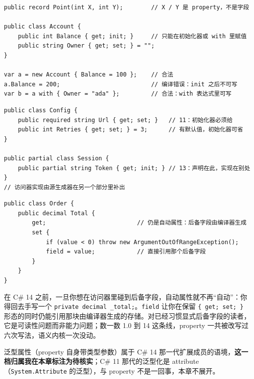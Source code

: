 \documentclass[12pt,a4paper,fontset=fandol]{ctexbook}
\newcommand{\csharplabel}{%
  \tcbox[on line,colback=csharpheadbg,colframe=csharpheadbg,
    boxrule=0pt,arc=1pt,left=2pt,right=2pt,top=1pt,bottom=1pt,
    colupper=white,fontupper=\scriptsize\bfseries]{C\#}}
\begin{document}
\csharplabel{}
\begin{lstlisting}[style=csharpstyle, caption={C\# 9.0：\texttt{init} 与 record 的位置式 property}, label={lst:ch2-cs-90}]
public record Point(int X, int Y);        // X / Y 是 property，不是字段

public class Account {
    public int Balance { get; init; }     // 只能在初始化器或 with 里赋值
    public string Owner { get; set; } = "";
}

var a = new Account { Balance = 100 };    // 合法
a.Balance = 200;                          // 编译错误：init 之后不可写
var b = a with { Owner = "ada" };         // 合法：with 表达式里可写
\end{lstlisting}

\csharplabel{}
\begin{lstlisting}[style=csharpstyle, caption={C\# 11 的 \texttt{required} 与 C\# 13 的 partial property}, label={lst:ch2-cs-11}]
public class Config {
    public required string Url { get; set; }   // 11：初始化器必须给
    public int Retries { get; set; } = 3;      // 有默认值，初始化器可省
}

public partial class Session {
    public partial string Token { get; init; } // 13：声明在此，实现在别处
}
// 访问器实现由源生成器在另一个部分里补出
\end{lstlisting}

\csharplabel{}
\begin{lstlisting}[style=csharpstyle, caption={C\# 14：\texttt{field} 上下文关键字}, label={lst:ch2-cs-14}]
public class Order {
    public decimal Total {
        get;                          // 仍是自动属性：后备字段由编译器生成
        set {
            if (value < 0) throw new ArgumentOutOfRangeException();
            field = value;            // 直接引用那个后备字段
        }
    }
}
\end{lstlisting}

\begin{note}[title={\texttt{field} 解决的是样板问题}]
在 C\# 14 之前，一旦你想在访问器里碰到后备字段，自动属性就不再“自动”：你得回去手写一个 \texttt{private decimal \_total;}。\texttt{field} 让你在保留 \texttt{\{ get; set; \}} 形态的同时仍能引用那块由编译器生成的存储。对已经习惯显式后备字段的读者，它是可读性问题而非能力问题；数一数 1.0 到 14 这条线，property 一共被改写过六次写法，语义内核一次没动。
\end{note}

泛型属性（property 自身带类型参数）属于 C\# 14 那一代扩展成员的语境，\textbf{这一档归属我在本章标注为待核实}；C\# 11 那代的泛型化是 attribute（\texttt{System.Attribute} 的泛型），与 property 不是一回事，本章不展开。
\end{document}
